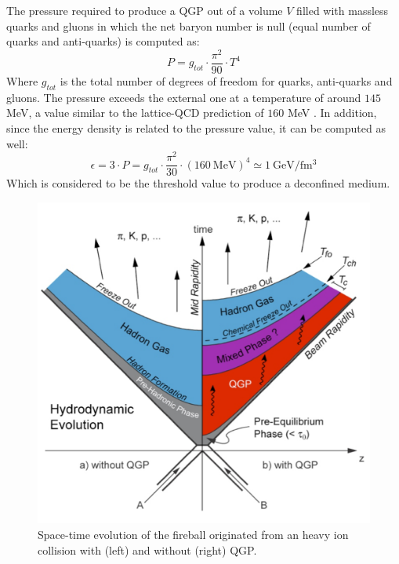 The pressure required to produce a QGP out of a volume $V$ filled with massless quarks and gluons in which the net baryon number is null (equal number of quarks and anti-quarks) is computed as:
\begin{equation}
P = g_{tot}\cdot\frac{\pi^2}{90}\cdot T^4
\end{equation}
Where $g_{tot}$ is the total number of degrees of freedom for quarks, anti-quarks and gluons.
The pressure exceeds the external one at a temperature of around $145$ MeV, a value similar to the lattice-QCD prediction of $160$ MeV \cite{Kapoyannis:2017hcz}.
In addition, since the energy density is related to the pressure value, it can be computed as well:
\begin{equation}
\epsilon = 3\cdot P = g_{tot}\cdot\frac{\pi^2}{30}\cdot (160\ \mathrm{MeV})^4 \simeq 1\ \mathrm{GeV/fm^3}
\end{equation}
Which is considered to be the threshold value to produce a deconfined medium.

\begin{figure}[!t]
\begin{center}
\includegraphics[width=0.85\linewidth]{Chapters/Introduction/Figs/QGP_evo.pdf}
\caption{Space-time evolution of the fireball originated from an heavy ion collision with (left) and without (right) QGP.}
\label{fig:evolution}
\end{center}
\end{figure}

